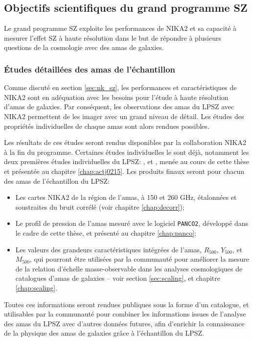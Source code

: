 \subsection{Objectifs scientifiques du grand programme SZ} \label{sec:lpsz_sci}

Le grand programme SZ exploite les performances de NIKA2 et sa capacité à mesurer l'effet SZ à haute résolution dans le but de répondre à plusieurs questions de la cosmologie avec des amas de galaxies.

\subsubsection{Études détaillées des amas de l'échantillon} %
Comme discuté en section \ref{sec:nk_sz}, les performances et caractéristiques de NIKA2 sont en adéquation avec les besoins pour l'étude à haute résolution d'amas de galaxies.
Par conséquent, les observations des amas du LPSZ avec NIKA2 permettent de les imager avec un grand niveau de détail.
Les études des propriétés individuelles de chaque amas sont alors rendues possibles.

Les résultats de ces études seront rendus disponibles par la collaboration NIKA2 à la fin du programme.
Certaines études individuelles le sont déjà, notamment les deux premières études individuelles du LPSZ: \cite{ruppin_first_2018}, et \cite{keruzore_exploiting_2020}, menée au cours de cette thèse et présentée au chapitre \ref{chap:actj0215}.
Les produits finaux seront pour chacun des amas de l'échantillon du LPSZ:
\begin{itemize}[leftmargin=*]
\setlength\itemsep{5pt}
    \item Les cartes NIKA2 de la région de l'amas, à 150 et 260 GHz, étalonnées et soustraites du bruit corrélé (voir chapitre \ref{chap:decorr});
    \item Le profil de pression de l'amas mesuré avec le logiciel \texttt{PANCO2}, développé dans le cadre de cette thèse, et présenté au chapitre \ref{chap:panco};
    \item Les valeurs des grandeurs caractéristiques intégrées de l'amas, $R_{500}$, $Y_{500}$, et $M_{500}$, qui pourront être utilisées par la communauté pour améliorer la mesure de la relation d'échelle masse-observable dans les analyses cosmologiques de catalogues d'amas de galaxies -- voir section \ref{sec:scaling}, et chapitre \ref{chap:scaling}.
\end{itemize}
Toutes ces informations seront rendues publiques sous la forme d'un catalogue, et utilisables par la communauté pour combiner les informations issues de l'analyse des amas du LPSZ avec d'autres données futures, afin d'enrichir la connaissance de la physique des amas de galaxies grâce à l'échantillon du LPSZ.

